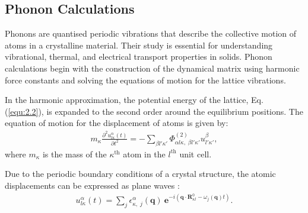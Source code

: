 \subsection{Phonon Calculations} \label{subsec:2.1.2}

Phonons are quantised periodic vibrations that describe the collective motion of atoms in a crystalline material. Their study is essential for understanding vibrational, thermal, and electrical transport properties in solids.
Phonon calculations begin with the construction of the dynamical matrix using harmonic force constants and solving the equations of motion for the lattice vibrations.

In the harmonic approximation, the potential energy of the lattice, Eq. (\ref{equ:2.2}), is expanded to the second order around the equilibrium positions. 
The equation of motion for the displacement of atoms is given by:
\begin{equation}
\label{equ:2.7}
    \begin{split}
        m_{\kappa}\frac{\partial^{2} u^{\alpha}_{l\kappa}(t)}{\partial t^{2}}=-\sum_{\beta l' \kappa'} \Phi^{(2)}_{\alpha l\kappa,\;\beta l'\kappa'}u^{\beta}_{l'\kappa'},
    \end{split}
\end{equation}
where $m_{\kappa}$ is the mass of the $\kappa^{\text{th}}$ atom in the $l^{\text{th}}$ unit cell.

Due to the periodic boundary conditions of a crystal structure, the atomic displacements can be expressed as plane waves \cite{ziman_2007,kantorovich_2004}:
\begin{equation}
\label{equ:2.8}
    \begin{split}
        u^{\alpha}_{l\kappa}(t)= \sum_{j}\epsilon^{\alpha}_{\kappa,\;j}(\mathbf{q})\:\textbf{e}^{-i\left(\mathbf{q}\cdot\mathbf{R}^{0}_{\kappa l}-\omega_{j}(\mathbf{q})t\right)}.
    \end{split}
\end{equation}

